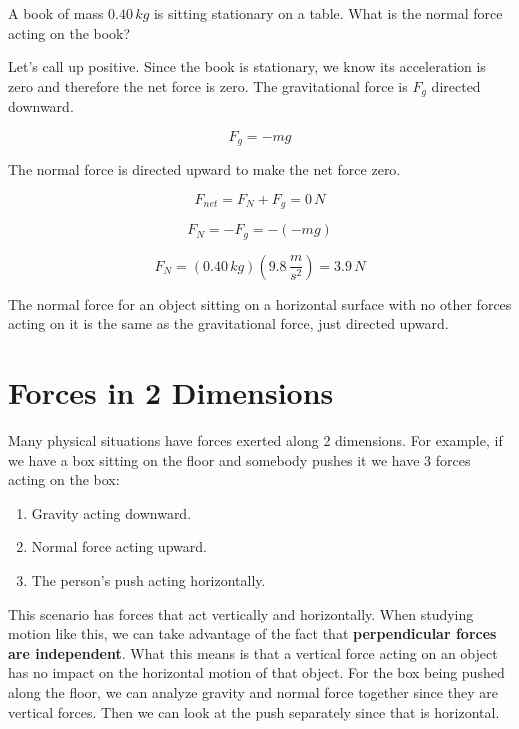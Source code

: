 \documentclass[12pt]{book}
\begin{document}
\begin{exampleblock}


A book of mass $0.40 \, kg$ is sitting stationary on a table. What is the normal force acting on the book?

\hspace{10pt}

Let's call up positive. Since the book is stationary, we know its acceleration is zero and therefore the net force is zero. The gravitational force is $F_g$ directed downward. 

\begin{equation}
F_g = -mg
\end{equation}

The normal force is directed upward to make the net force zero.

\begin{equation}
F_{net} = F_N + F_g = 0 \, N
\end{equation}

\begin{equation}
F_N = -F_g = -(-mg)
\end{equation}

\begin{equation}
F_N = (0.40 \, kg) (9.8 \, \frac{m}{s^2}) = 3.9 \, N
\end{equation}

The normal force for an object sitting on a horizontal surface with no other forces acting on it is the same as the gravitational force, just directed upward.

\end{exampleblock}

\section{Forces in 2 Dimensions}

Many physical situations have forces exerted along 2 dimensions. For example, if we have a box sitting on the floor and somebody pushes it we have 3 forces acting on the box:

\begin{enumerate}
\item Gravity acting downward.
\item Normal force acting upward.
\item The person's push acting horizontally.
\end{enumerate}

This scenario has forces that act vertically and horizontally. When studying motion like this, we can take advantage of the fact that \textbf{perpendicular forces are independent}. What this means is that a vertical force acting on an object has no impact on the horizontal motion of that object. For the box being pushed along the floor, we can analyze gravity and normal force together since they are vertical forces. Then we can look at the push separately since that is horizontal.
\end{document}

